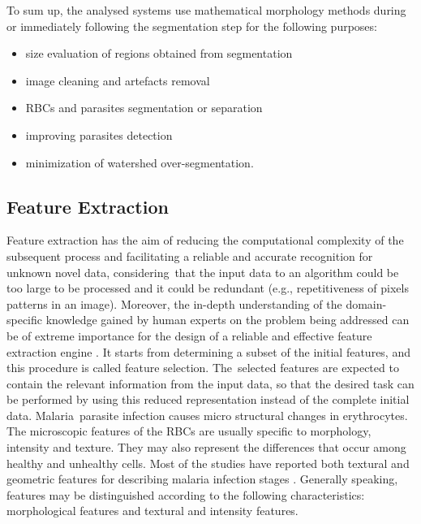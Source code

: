 \documentclass[sensors,review,accept,moreauthors,pdftex,10pt,a4paper]{mdpi}
\begin{document}
To sum up, the analysed systems use mathematical morphology methods during or immediately following the segmentation step for the following purposes:


\begin{itemize}
	\item size evaluation of regions obtained from segmentation
	\item image cleaning and artefacts removal
	\item RBCs and parasites segmentation or separation
	\item improving parasites detection
	\item minimization of watershed over-segmentation.
\end{itemize}



\subsection{Feature Extraction}
Feature extraction has the aim of reducing the computational complexity of the subsequent process and facilitating a reliable and accurate recognition for unknown novel data, considering~that the input data to an algorithm could be too large to be processed and it could be redundant (e.g., repetitiveness of pixels patterns in an image). Moreover, the in-depth understanding of the domain-specific knowledge gained by human experts on the problem being addressed can be of extreme importance for the design of a reliable and effective feature extraction engine \cite{Jiang2009}.
It starts from determining a subset of the initial features, and this procedure is called feature selection. The~selected features are expected to contain the relevant information from the input data, so that the desired task can be performed by using this reduced representation instead of the complete initial data.
Malaria~parasite infection causes micro structural changes in erythrocytes. The microscopic features of the RBCs are usually specific to morphology, intensity and texture. They may also represent the differences that occur among healthy and unhealthy cells. Most of the studies have reported both textural and geometric features for describing malaria infection stages \cite{Das2015}.
Generally speaking, features may be distinguished according to the following characteristics: morphological features and textural and intensity features.
\end{document}
